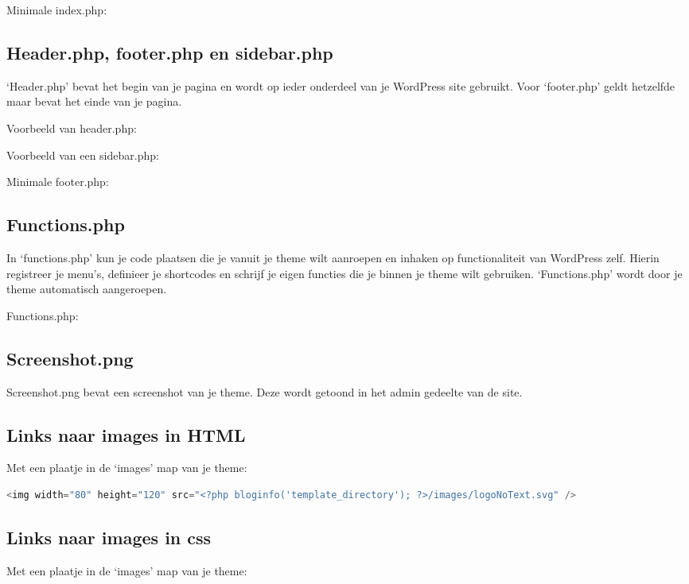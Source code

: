 \documentclass[8pt,pagesize,footinclude=false,headinclude=false]{scrartcl}
\begin{document}
\begin{multicols*}{2}
\noindent Minimale index.php:
\lstset{language=PHP}


\subsection*{Header.php, footer.php en sidebar.php}
`Header.php' bevat het begin van je pagina en wordt op ieder onderdeel van je WordPress site gebruikt. Voor `footer.php' geldt hetzelfde maar bevat het einde van je pagina.

\noindent Voorbeeld van header.php:


\noindent Voorbeeld van een sidebar.php:


\noindent Minimale footer.php:


\subsection*{Functions.php}
In `functions.php' kun je code plaatsen die je vanuit je theme wilt aanroepen en inhaken op functionaliteit van WordPress zelf. Hierin registreer je menu's, definieer je shortcodes en schrijf je eigen functies die je binnen je theme wilt gebruiken. `Functions.php' wordt door je theme automatisch aangeroepen.

\noindent Functions.php:


\subsection*{Screenshot.png}
Screenshot.png bevat een screenshot van je theme. Deze wordt getoond in het admin gedeelte van de site.

\subsection*{Links naar images in HTML}
Met een plaatje in de `images' map van je theme:

\begin{lstlisting}[language=PHP]
<img width="80" height="120" src="<?php bloginfo('template_directory'); ?>/images/logoNoText.svg" />
\end{lstlisting}

\subsection*{Links naar images in css}
Met een plaatje in de `images' map van je theme:


\end{multicols*}
\end{document}
